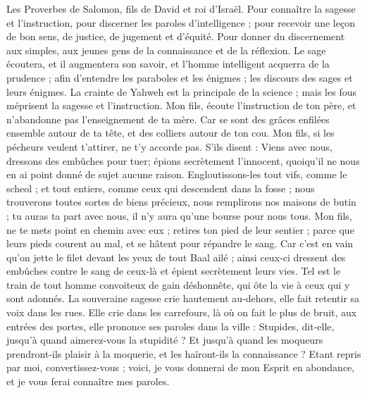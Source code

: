 \begin{multicols}{2}
\TextTitle{[But du livre : connaître la sagesse}
\VerseOne{}Les Proverbes de Salomon, fils de David et roi d'Israël.
Pour connaître la sagesse et l'instruction, pour discerner les paroles d'intelligence ;
pour recevoir une leçon de bon sens, de justice, de jugement et d'équité.
Pour donner du discernement aux simples, aux jeunes gens de la connaissance et de la réflexion.
Le sage écoutera, et il augmentera son savoir, et l'homme intelligent acquerra de la prudence ;
afin d'entendre les paraboles et les énigmes ; les discours des sages et leurs énigmes.
La crainte de Yahweh est la principale de la science ; mais les fous méprisent la sagesse et l'instruction.
Mon fils, écoute l'instruction de ton père, et n'abandonne pas l'enseignement de ta mère.
Car se sont des grâces enfilées ensemble autour de ta tête, et des colliers autour de ton cou.
Mon fils, si les pécheurs veulent t'attirer, ne t'y accorde pas.
S'ils disent : Viens avec nous, dressons des embûches pour tuer; épions secrètement l'innocent, quoiqu'il ne nous en ai point donné de sujet aucune raison.
Engloutissons-les tout vifs, comme le scheol ; et tout entiers, comme ceux qui descendent dans la fosse ;
nous trouverons toutes sortes de biens précieux, nous remplirons nos maisons de butin ;
tu auras ta part avec nous, il n'y aura qu'une bourse pour nous tous.
Mon fils, ne te mets point en chemin avec eux ; retires ton pied de leur sentier ;
parce que leurs pieds courent au mal, et se hâtent pour répandre le sang.
Car c'est en vain qu'on jette le filet devant les yeux de tout Baal ailé ;
ainsi ceux-ci dressent des embûches contre le sang de ceux-là et épient secrètement leurs vies.
Tel est le train de tout homme convoiteux de gain déshonnête, qui ôte la vie à ceux qui y sont adonnés.
La souveraine sagesse crie hautement au-dehors, elle fait retentir sa voix dans les rues.
Elle crie dans les carrefours, là où on fait le plus de bruit, aux entrées des portes, elle prononce ses paroles dans la ville :
Stupides, dit-elle, jusqu'à quand aimerez-vous la stupidité ? Et jusqu'à quand les moqueurs prendront-ils plaisir à la moquerie, et les haïront-ils la connaissance ?
Etant repris par moi, convertissez-vous ; voici, je vous donnerai de mon Esprit en abondance, et je vous ferai connaître mes paroles.

\end{multicols}

